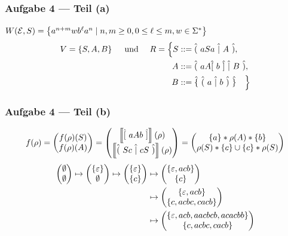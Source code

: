\documentclass{beamer}
\newcommand{\wdh}[1]{\hat{\{} \ #1 \ \hat{\}}}
\newcommand{\opt}[2]{\hat{(} \ #1 \ \hat{|} \ #2 \ \hat{)}}
\newcommand{\byp}[1]{\hat{[} \ #1 \ \hat{]}}
\newcommand{\sem}[1]{\left\llbracket #1 \right\rrbracket}
\begin{document}
\begin{frame} \frametitle{Aufgabe 4 --- Teil (a)}
	$W(\mathcal{E},S) = \left\{ a^{n+m} w b^\ell a^n \mid n,m \ge 0, 0 \le \ell \le m, w \in \Sigma^\ast \right\}$
	\pause
	\begin{align*}
		V = \menge{S,A,B} \quad \und \quad  
		R = \Big\{ S &::= \opt{aSa}{A} ,\\
			A & ::= \opt{aA \byp{b}}{B}, \\
			B & ::= \wdh{\opt{a}{b}} \quad \Big\}
	\end{align*}
\end{frame}

\begin{frame} \frametitle{Aufgabe 4 --- Teil (b)}
	\begin{align*}
		f(\rho) = \begin{pmatrix} f(\rho)(S) \\ f(\rho)(A) \end{pmatrix} 
		= \begin{pmatrix} \sem{\byp{aAb}}(\rho) \\ \sem{\opt{Sc}{cS}}(\rho) \end{pmatrix} 
		= \begin{pmatrix}
		\menge{a} * \rho(A) * \menge{b} \\ \rho(S) * \menge{c} \cup \menge{c} * \rho(S)
		\end{pmatrix}
	\end{align*}
	\begin{align*}
		\begin{pmatrix} \emptyset \\ \emptyset \end{pmatrix}
		\mapsto
		\begin{pmatrix} \left\{ \varepsilon \right\} \\ \emptyset \end{pmatrix}
		\mapsto
		\begin{pmatrix} \left\{ \varepsilon \right\} \\ \left\{ c \right\} \end{pmatrix}
		&\mapsto
		\begin{pmatrix} \left\{ \varepsilon,acb \right\} \\ \left\{ c \right\} \end{pmatrix} \\
		&\mapsto
		\begin{pmatrix} \left\{ \varepsilon,acb \right\} \\ \left\{ c,acbc,cacb \right\} \end{pmatrix} \\
		&\mapsto
		\begin{pmatrix} \left\{ \varepsilon,acb,aacbcb,acacbb \right\} \\ \left\{ c,acbc,cacb \right\} \end{pmatrix}
	\end{align*}
\end{frame}
\end{document}
